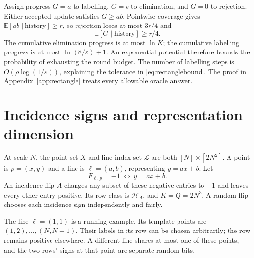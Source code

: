 \documentclass[11pt,letterpaper,pmlr,twoside]{jmlr}
\newcommand{\Hc}{\mathcal H}
\newcommand{\Lc}{\mathcal L}
\newcommand{\E}{\mathbb E}
\newcommand{\eps}{\varepsilon}
\begin{document}
Assign progress $G=a$ to labelling, $G=b$ to elimination, and $G=0$ to rejection. Either accepted update satisfies $G\ge ab$. Pointwise coverage gives $\E[ab\mid\text{history}]\ge r$, so rejection loses at most $3r/4$ and
\begin{equation}
 \E[G\mid\text{history}]\ge r/4.
 \label{eq:drift}
\end{equation}
The cumulative elimination progress is at most $\ln K$; the cumulative labelling progress is at most $\ln(8/\eps)+1$. An exponential potential therefore bounds the probability of exhausting the round budget. The number of labelling steps is $O(\rho\log(1/\eps))$, explaining the tolerance in \eqref{eq:rectanglebound}. The proof in Appendix~\ref{app:rectangle} treats every allowable oracle answer.

\section{Incidence signs and representation dimension}\label{sec:incidence}
At scale $N$, the point set $X$ and line index set $\Lc$ are both $[N]\times[2N^2]$. A point is $p=(x,y)$ and a line is $\ell=(a,b)$, representing $y=ax+b$. Let
\begin{equation}
 F_{\ell,p}=-1\ \Longleftrightarrow\ y=ax+b.
 \label{eq:grid}
\end{equation}
An incidence flip $A$ changes any subset of these negative entries to $+1$ and leaves every other entry positive. Its row class is $\Hc_A$, and $K=Q=2N^3$. A random flip chooses each incidence sign independently and fairly.

The line $\ell=(1,1)$ is a running example. Its template points are $(1,2),\ldots,(N,N+1)$. Their labels in its row can be chosen arbitrarily; the row remains positive elsewhere. A different line shares at most one of these points, and the two rows' signs at that point are separate random bits.
\end{document}
